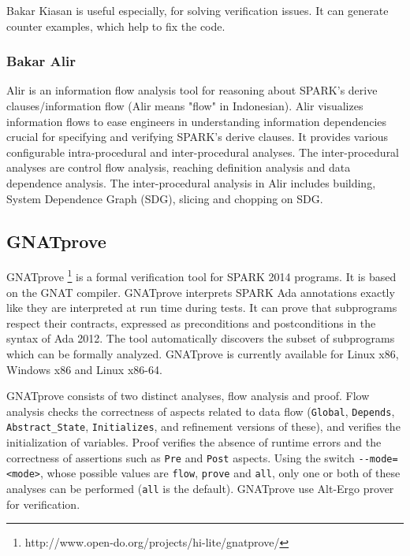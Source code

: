 Bakar Kiasan is useful especially, for solving verification issues. It can generate counter examples, which help to fix the code.


\subsubsection{Bakar Alir}
Alir is an information flow analysis tool for reasoning about SPARK's derive clauses/information flow (Alir means "flow" in Indonesian). Alir visualizes information flows to ease engineers in understanding information dependencies crucial for specifying and verifying SPARK's derive clauses. It provides various configurable intra-procedural and inter-procedural analyses. The inter-procedural analyses are control flow analysis, reaching definition analysis and data dependence analysis. The inter-procedural analysis in Alir includes building, System Dependence Graph (SDG), slicing and chopping on SDG. \cite{Hari:Thesis}


\subsection{GNATprove}
\label{background:sparkverification:gnatprove}

GNATprove \footnote{http://www.open-do.org/projects/hi-lite/gnatprove/} is a formal verification tool for SPARK 2014 programs. It is based on the GNAT compiler. GNATprove interprets SPARK Ada annotations exactly like they are interpreted at run time during tests. It can prove that subprograms respect their contracts, expressed as preconditions and postconditions in the syntax of Ada 2012. The tool automatically discovers the subset of subprograms which can be formally analyzed. GNATprove is currently available for Linux x86, Windows x86 and Linux x86-64.

GNATprove consists of two distinct analyses, flow analysis and proof. Flow analysis checks the correctness of aspects related to data flow (\lstinline{Global}, \lstinline{Depends}, \lstinline{Abstract_State}, \lstinline{Initializes}, and refinement versions of these), and verifies the initialization of variables. Proof verifies the absence of runtime errors and the correctness of assertions such as \lstinline{Pre} and \lstinline{Post} aspects. Using the switch \lstinline{--mode=<mode>}, whose possible values are \lstinline{flow}, \lstinline{prove} and \lstinline{all}, only one or both of these analyses can be performed (\lstinline{all} is the default). \cite{Spark2014userGuide:Online} GNATprove use Alt-Ergo prover for verification.




